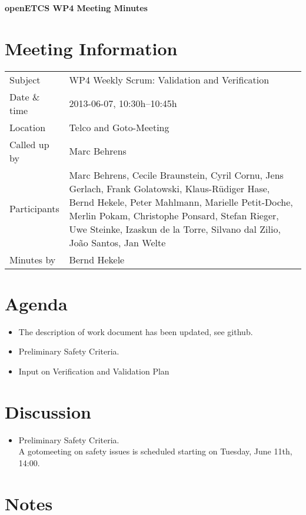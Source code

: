 \documentclass[a4paper, 11pt]{article}
\begin{document}
{\begin{center}\huge\bf openETCS WP4 Meeting Minutes\end{center}}
\section{Meeting Information}

\renewcommand{\arraystretch}{1.5}
\begin{supertabular}{m{.2\textwidth}m{.8\textwidth}}
Subject & WP4 Weekly Scrum: Validation and Verification\\
Date \& time & 2013-06-07, 10:30h--10:45h\\
Location & Telco and Goto-Meeting\\
Called up by & Marc Behrens\\
Participants &
Marc Behrens,
Cecile Braunstein,
Cyril Cornu,
Jens Gerlach,
Frank Golatowski,
Klaus-R\"udiger Hase,
Bernd Hekele,
Peter Mahlmann,
Marielle Petit-Doche,
Merlin Pokam,
Christophe Ponsard,
Stefan Rieger,
Uwe Steinke,
Izaskun de la Torre,
Silvano dal Zilio,
Jo\~ao Santos,
Jan Welte
\\

Minutes by & Bernd Hekele\\

\end{supertabular}
\renewcommand{\arraystretch}{1.0}


\section{{Agenda}}
\begin{itemize}
\item The description of work document has been updated, see github.
\item Preliminary Safety Criteria.
\item Input on Verification and Validation Plan
\end{itemize}

\section{Discussion}
\begin{itemize}
\item Preliminary Safety Criteria.\\
A gotomeeting on safety issues is scheduled starting on Tuesday, June 11th, 14:00.\
\end{itemize}


\section{Notes}
\end{document}
